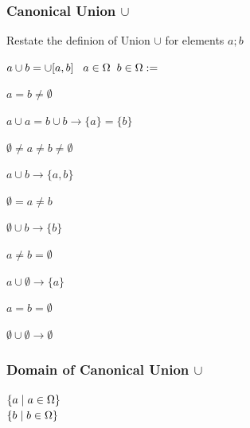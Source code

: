 \documentclass[11pt]{article}
\begin{document}
\subsubsection{Canonical Union $\cup$}
Restate the definion of Union $\cup$ for elements $a;b$
\vspace{2mm}
\begin{center}
$
a  \cup  b = \cup[a,b] \hspace{3mm} a \in \Omega \hspace{2mm} b \in \Omega := 
$
\end{center}
$a = b \neq \emptyset$
\begin{center}
$
a  \cup  a = b \cup b \rightarrow \{a\} = \{b\}
$
\end{center}
\vspace{2mm}
$\emptyset \neq a \neq b \neq \emptyset$
\begin{center}
$
a \cup  b \rightarrow \{a,b\}
$
\end{center}
\vspace{2mm}
$\emptyset = a \neq b$
\begin{center}
$
\emptyset \cup  b \rightarrow \{b\}
$
\end{center}
\vspace{2mm}
$a \neq b = \emptyset$
\begin{center}
$
a \cup \emptyset \rightarrow \{a\}
$
\end{center}
\vspace{2mm}
$a = b = \emptyset$
\begin{center}
$
\emptyset \cup \emptyset \rightarrow \emptyset
$
\end{center}
\subsubsection{Domain of Canonical Union $\cup$}
\begin{center}
$
\{ a \hspace{1mm} | \hspace{1mm} a \in \Omega\}
$
\\ \vspace{2mm}
$
\{ b \hspace{1mm}|\hspace{1mm} b \in \Omega\}
$
\end{center}
\end{document}
